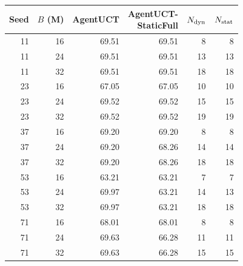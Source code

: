 \begin{tabular}{@{}rrrrrr@{}}
\toprule
Seed & $B$ (M) & AgentUCT & \shortstack{AgentUCT-\\StaticFull} & $N_{\rm dyn}$ & $N_{\rm stat}$\\
\midrule
11 & 16 & 69.51 & 69.51 & 8 & 8\\
11 & 24 & 69.51 & 69.51 & 13 & 13\\
11 & 32 & 69.51 & 69.51 & 18 & 18\\
23 & 16 & 67.05 & 67.05 & 10 & 10\\
23 & 24 & 69.52 & 69.52 & 15 & 15\\
23 & 32 & 69.52 & 69.52 & 19 & 19\\
37 & 16 & 69.20 & 69.20 & 8 & 8\\
37 & 24 & 69.20 & 68.26 & 14 & 14\\
37 & 32 & 69.20 & 68.26 & 18 & 18\\
53 & 16 & 63.21 & 63.21 & 7 & 7\\
53 & 24 & 69.97 & 63.21 & 14 & 13\\
53 & 32 & 69.97 & 63.21 & 18 & 18\\
71 & 16 & 68.01 & 68.01 & 8 & 8\\
71 & 24 & 69.63 & 66.28 & 11 & 11\\
71 & 32 & 69.63 & 66.28 & 15 & 15\\
\bottomrule
\end{tabular}
